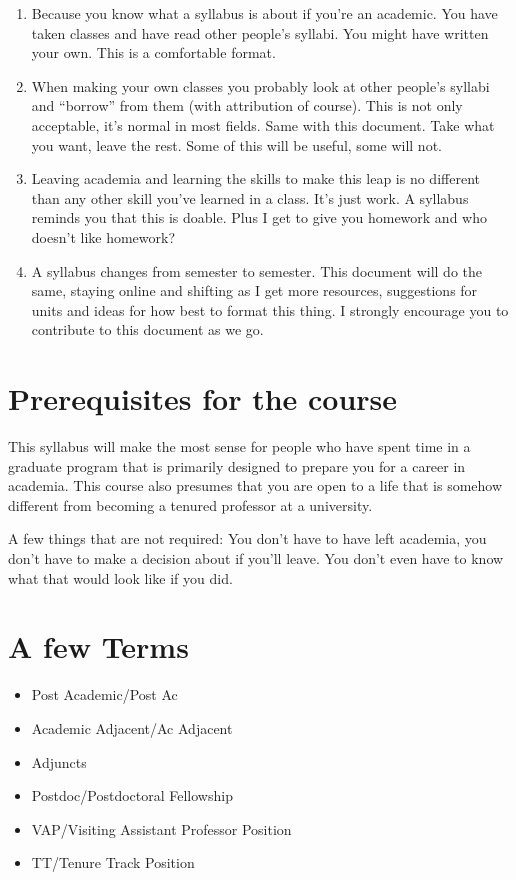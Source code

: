 \documentclass[]{book}
\providecommand{\tightlist}{%
  \setlength{\itemsep}{0pt}\setlength{\parskip}{0pt}}
\theoremstyle{definition}
\theoremstyle{definition}
\theoremstyle{definition}
\theoremstyle{remark}
\begin{document}
\begin{enumerate}
\def\labelenumi{\arabic{enumi})}
\item
  Because you know what a syllabus is about if you're an academic. You
  have taken classes and have read other people's syllabi. You might
  have written your own. This is a comfortable format.\\
\item
  When making your own classes you probably look at other people's
  syllabi and ``borrow'' from them (with attribution of course). This is
  not only acceptable, it's normal in most fields. Same with this
  document. Take what you want, leave the rest. Some of this will be
  useful, some will not.
\item
  Leaving academia and learning the skills to make this leap is no
  different than any other skill you've learned in a class. It's just
  work. A syllabus reminds you that this is doable. Plus I get to give
  you homework and who doesn't like homework?
\item
  A syllabus changes from semester to semester. This document will do
  the same, staying online and shifting as I get more resources,
  suggestions for units and ideas for how best to format this thing. I
  strongly encourage you to contribute to this document as we go.
\end{enumerate}

\section{Prerequisites for the
course}\label{prerequisites-for-the-course}

This syllabus will make the most sense for people who have spent time in
a graduate program that is primarily designed to prepare you for a
career in academia. This course also presumes that you are open to a
life that is somehow different from becoming a tenured professor at a
university.

A few things that are not required: You don't have to have left
academia, you don't have to make a decision about if you'll leave. You
don't even have to know what that would look like if you did.

\section{A few Terms}\label{a-few-terms}

\begin{itemize}
\tightlist
\item
  Post Academic/Post Ac
\item
  Academic Adjacent/Ac Adjacent
\item
  Adjuncts
\item
  Postdoc/Postdoctoral Fellowship
\item
  VAP/Visiting Assistant Professor Position
\item
  TT/Tenure Track Position
\end{itemize}
\end{document}

